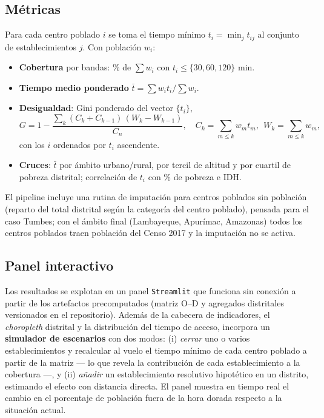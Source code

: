 \documentclass[11pt,a4paper]{article}
\begin{document}
\subsection{M\'etricas}
Para cada centro poblado $i$ se toma el tiempo m\'inimo
$t_i=\min_j t_{ij}$ al conjunto de establecimientos $j$. Con poblaci\'on $w_i$:
\begin{itemize}
  \item \textbf{Cobertura} por bandas: \% de $\sum w_i$ con $t_i\le\{30,60,120\}$ min.
  \item \textbf{Tiempo medio ponderado} $\bar t = \sum w_i t_i / \sum w_i$.
  \item \textbf{Desigualdad}: Gini ponderado del vector $\{t_i\}$,
  \begin{equation}
    G = 1 - \frac{\sum_{k} (C_k + C_{k-1})\,(W_k - W_{k-1})}{C_n},\quad
    C_k = \!\!\sum_{m\le k}\! w_m t_m,\ \ W_k=\!\!\sum_{m\le k}\! w_m,
  \end{equation}
  con los $i$ ordenados por $t_i$ ascendente.
  \item \textbf{Cruces}: $\bar t$ por \'ambito urbano/rural, por tercil de
        altitud y por cuartil de pobreza distrital; correlaci\'on de $t_i$ con
        \% de pobreza e IDH.
\end{itemize}
El pipeline incluye una rutina de imputaci\'on para centros poblados sin
poblaci\'on (reparto del total distrital seg\'un la categor\'ia del centro
poblado), pensada para el caso Tumbes; con el \'ambito final (Lambayeque,
Apur\'imac, Amazonas) todos los centros poblados traen poblaci\'on del Censo
2017 y la imputaci\'on no se activa.

\subsection{Panel interactivo}
Los resultados se explotan en un panel \texttt{Streamlit} que funciona sin
conexi\'on a partir de los artefactos precomputados (matriz O--D y agregados
distritales versionados en el repositorio). Adem\'as de la cabecera de
indicadores, el \emph{choropleth} distrital y la distribuci\'on del tiempo de
acceso, incorpora un \textbf{simulador de escenarios} con dos modos: (i)
\emph{cerrar} uno o varios establecimientos y recalcular al vuelo el tiempo
m\'inimo de cada centro poblado a partir de la matriz --- lo que revela la
contribuci\'on de cada establecimiento a la cobertura ---, y (ii) \emph{a\~nadir} un
establecimiento resolutivo hipot\'etico en un distrito, estimando el efecto con
distancia directa. El panel muestra en tiempo real el cambio en el porcentaje
de poblaci\'on fuera de la hora dorada respecto a la situaci\'on actual.
\end{document}
